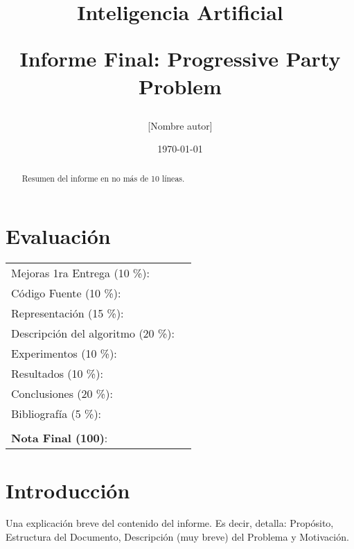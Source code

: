 \documentclass[letter, 10pt]{article}
\begin{document}
\title{Inteligencia Artificial \\ \begin{Large}Informe Final: Progressive Party Problem\end{Large}}
\author{[Nombre autor]}
\date{\today}
\maketitle


\section*{Evaluaci\'on}

\begin{tabular}{ll}
Mejoras 1ra Entrega (10 \%): &  \underline{\hspace{2cm}}\\
C\'odigo Fuente (10 \%): &  \underline{\hspace{2cm}}\\
Representaci\'on (15 \%):  & \underline{\hspace{2cm}} \\
Descripci\'on del algoritmo (20 \%):  & \underline{\hspace{2cm}} \\
Experimentos (10 \%):  & \underline{\hspace{2cm}} \\
Resultados (10 \%):  & \underline{\hspace{2cm}} \\
Conclusiones (20 \%): &  \underline{\hspace{2cm}}\\
Bibliograf\'ia (5 \%): & \underline{\hspace{2cm}}\\
 &  \\
\textbf{Nota Final (100)}:   & \underline{\hspace{2cm}}
\end{tabular}

\begin{abstract}
Resumen del informe en no m\'as de 10 l\'ineas.
\end{abstract}

\section{Introducci\'on}
Una explicaci\'on breve del contenido del informe. Es decir, detalla: Prop\'osito, Estructura del Documento, Descripci\'on (muy breve) del Problema y Motivaci\'on.
\end{document}
